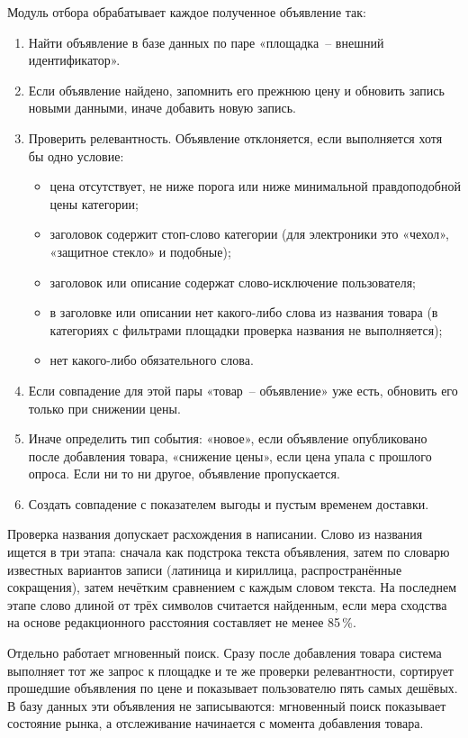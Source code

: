 Модуль отбора обрабатывает каждое полученное объявление так:
\begin{enumerate}
	\item Найти объявление в базе данных по паре «площадка~-- внешний идентификатор».
	\item Если объявление найдено, запомнить его прежнюю цену и обновить запись новыми данными, иначе добавить новую запись.
	\item Проверить релевантность. Объявление отклоняется, если выполняется хотя бы одно условие:
	\begin{itemize}[itemindent=2.2ex,leftmargin=2\parindent,label=--]
		\item цена отсутствует, не ниже порога или ниже минимальной правдоподобной цены категории;
		\item заголовок содержит стоп-слово категории (для электроники это «чехол», «защитное стекло» и подобные);
		\item заголовок или описание содержат слово-исключение пользователя;
		\item в заголовке или описании нет какого-либо слова из названия товара (в категориях с фильтрами площадки проверка названия не выполняется);
		\item нет какого-либо обязательного слова.
	\end{itemize}
	\item Если совпадение для этой пары «товар~-- объявление» уже есть, обновить его только при снижении цены.
	\item Иначе определить тип события: «новое», если объявление опубликовано после добавления товара, «снижение цены», если цена упала с прошлого опроса. Если ни то ни другое, объявление пропускается.
	\item Создать совпадение с показателем выгоды и пустым временем доставки.
\end{enumerate}

Проверка названия допускает расхождения в написании. Слово из названия ищется в три этапа: сначала как подстрока текста объявления, затем по словарю известных вариантов записи (латиница и кириллица, распространённые сокращения), затем нечётким сравнением с каждым словом текста. На последнем этапе слово длиной от трёх символов считается найденным, если мера сходства на основе редакционного расстояния составляет не менее 85\,\%.

Отдельно работает мгновенный поиск. Сразу после добавления товара система выполняет тот же запрос к площадке и те же проверки релевантности, сортирует прошедшие объявления по цене и показывает пользователю пять самых дешёвых. В базу данных эти объявления не записываются: мгновенный поиск показывает состояние рынка, а отслеживание начинается с момента добавления товара.

